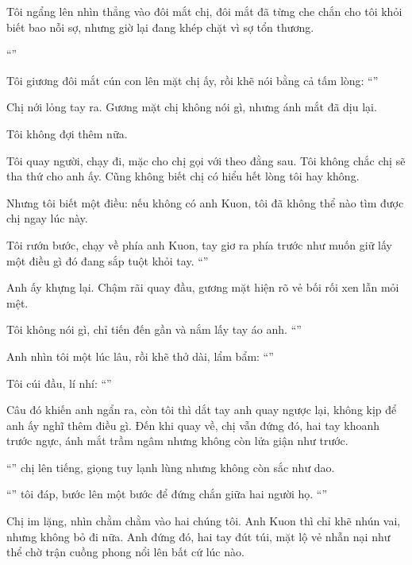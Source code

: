 \documentclass[../main.tex]{subfiles}
\begin{document}
Tôi ngẩng lên nhìn thẳng vào đôi mắt chị, đôi mắt đã từng che chắn cho tôi khỏi biết bao nỗi sợ, nhưng giờ lại đang khép chặt vì sợ tổn thương.

``''

Tôi giương đôi mắt cún con lên mặt chị ấy, rồi khẽ nói bằng cả tấm lòng: ``''

Chị nới lỏng tay ra. Gương mặt chị không nói gì, nhưng ánh mắt đã dịu lại.

Tôi không đợi thêm nữa.

Tôi quay người, chạy đi, mặc cho chị gọi với theo đằng sau. Tôi không chắc chị sẽ tha thứ cho anh ấy. Cũng không biết chị có hiểu hết lòng tôi hay không.

Nhưng tôi biết một điều: nếu không có anh Kuon, tôi đã không thể nào tìm được chị ngay lúc này.

Tôi rướn bước, chạy về phía anh Kuon, tay giơ ra phía trước như muốn giữ lấy một điều gì đó đang sắp tuột khỏi tay. ``''

Anh ấy khựng lại. Chậm rãi quay đầu, gương mặt hiện rõ vẻ bối rối xen lẫn mỏi mệt.

Tôi không nói gì, chỉ tiến đến gần và nắm lấy tay áo anh. ``''

Anh nhìn tôi một lúc lâu, rồi khẽ thở dài, lẩm bẩm: ``''

Tôi cúi đầu, lí nhí: ``''

Câu đó khiến anh ngẩn ra, còn tôi thì dắt tay anh quay ngược lại, không kịp để anh ấy nghĩ thêm điều gì. Đến khi quay về, chị vẫn đứng đó, hai tay khoanh trước ngực, ánh mắt trầm ngâm nhưng không còn lửa giận như trước.

``'' chị lên tiếng, giọng tuy lạnh lùng nhưng không còn sắc như dao.

``'' tôi đáp, bước lên một bước để đứng chắn giữa hai người họ. ``''

Chị im lặng, nhìn chằm chằm vào hai chúng tôi. Anh Kuon thì chỉ khẽ nhún vai, nhưng không bỏ đi nữa. Anh đứng đó, hai tay đút túi, mặt lộ vẻ nhẫn nại như thể chờ trận cuồng phong nổi lên bất cứ lúc nào.
\end{document}
